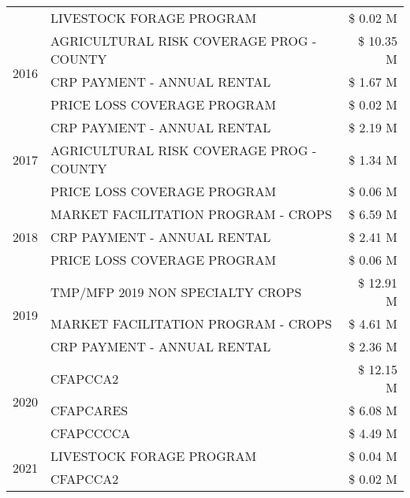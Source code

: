 \begin{tabular}{llr}
 & LIVESTOCK FORAGE PROGRAM & \$ 0.02 M \\
\cline{1-3}
\multirow[t]{3}{*}{2016} & AGRICULTURAL RISK COVERAGE PROG - COUNTY & \$ 10.35 M \\
 & CRP PAYMENT - ANNUAL RENTAL & \$ 1.67 M \\
 & PRICE LOSS COVERAGE PROGRAM & \$ 0.02 M \\
\cline{1-3}
\multirow[t]{3}{*}{2017} & CRP PAYMENT - ANNUAL RENTAL & \$ 2.19 M \\
 & AGRICULTURAL RISK COVERAGE PROG - COUNTY & \$ 1.34 M \\
 & PRICE LOSS COVERAGE PROGRAM & \$ 0.06 M \\
\cline{1-3}
\multirow[t]{3}{*}{2018} & MARKET FACILITATION PROGRAM - CROPS & \$ 6.59 M \\
 & CRP PAYMENT - ANNUAL RENTAL & \$ 2.41 M \\
 & PRICE LOSS COVERAGE PROGRAM & \$ 0.06 M \\
\cline{1-3}
\multirow[t]{3}{*}{2019} & TMP/MFP 2019 NON SPECIALTY CROPS & \$ 12.91 M \\
 & MARKET FACILITATION PROGRAM - CROPS & \$ 4.61 M \\
 & CRP PAYMENT - ANNUAL RENTAL & \$ 2.36 M \\
\cline{1-3}
\multirow[t]{3}{*}{2020} & CFAPCCA2 & \$ 12.15 M \\
 & CFAPCARES & \$ 6.08 M \\
 & CFAPCCCCA & \$ 4.49 M \\
\cline{1-3}
\multirow[t]{2}{*}{2021} & LIVESTOCK FORAGE PROGRAM & \$ 0.04 M \\
 & CFAPCCA2 & \$ 0.02 M \\
\cline{1-3}
\bottomrule
\end{tabular}

